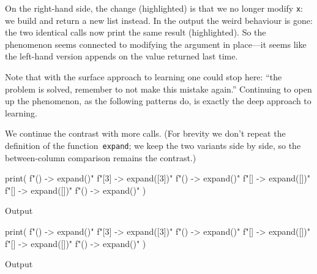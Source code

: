 \begin{description}
    On the right-hand side, the change (highlighted) is that we no longer
    modify \texttt{x}: we build and return a new list instead.
    In the output the weird behaviour is gone: the two identical calls now
    print the same result (highlighted).
    So the phenomenon seems connected to modifying the argument in place---it seems like the left-hand version appends on the value returned last
    time.

    Note that with the surface approach to learning one could stop here:
    \enquote{the problem is solved, remember to not make this mistake
    again.}
    Continuing to open up the phenomenon, as the following patterns do, is
    exactly the deep approach to learning.

    We continue the contrast with more calls.
    (For brevity we don't repeat the definition of the
    function~\texttt{expand}; we keep the two variants side by
    side, so the between-column comparison remains the contrast.)

    \begin{frame}[fragile]
    \begin{minipage}[t]{0.45\columnwidth}
      \begin{pyblock}[default2][highlightlines={4-7}]
print(
  f"()  -> {expand()}\n"
  f"[3] -> {expand([3])}\n"
  f"()  -> {expand()}\n"
  f"[]  -> {expand([])}\n"
  f"[]  -> {expand([])}\n"
  f"()  -> {expand()}\n"
)
      \end{pyblock}
      \begin{block}{Output}\printpythontex[verbatim][highlightlines={3-6}]\end{block}
    \end{minipage}
    \hfill
    \begin{minipage}[t]{0.45\columnwidth}
      \begin{pyblock}[default1]
print(
  f"()  -> {expand()}\n"
  f"[3] -> {expand([3])}\n"
  f"()  -> {expand()}\n"
  f"[]  -> {expand([])}\n"
  f"[]  -> {expand([])}\n"
  f"()  -> {expand()}\n"
)
      \end{pyblock}
      \begin{block}{Output}\printpythontex[verbatim]\end{block}
    \end{minipage}
    \end{frame}


\end{description}

